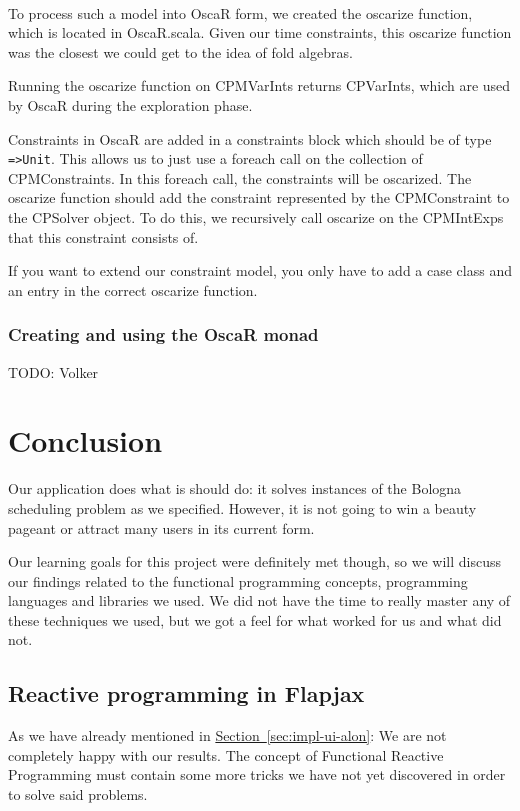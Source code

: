 \documentclass[a4paper]{article}
\begin{document}
\hspace*{1em}\\
To process such a model into OscaR form, 
we created the oscarize function, which is located in OscaR.scala.
Given our time constraints, 
this oscarize function was the closest we could get to the idea of fold algebras.

Running the oscarize function on CPMVarInts returns CPVarInts,
which are used by OscaR during the exploration phase.

Constraints in OscaR are added in a constraints block which should be of type
\verb|=>Unit|.
This allows us to just use a foreach call on the collection of CPMConstraints.
In this foreach call, the constraints will be oscarized.
The oscarize function should add the constraint represented by the CPMConstraint
to the CPSolver object.
To do this, we recursively call oscarize on the CPMIntExps
that this constraint consists of.

If you want to extend our constraint model,
you only have to add a case class and an entry in the correct oscarize function.


\subsubsection{Creating and using the OscaR monad}
{\Large TODO:} Volker



\section{Conclusion}
\label{sec:conclusion}
Our application does what is should do:
it solves instances of the Bologna scheduling problem as we specified.
However, it is not going to win a beauty pageant or attract many users in its 
current form.

Our learning goals for this project were definitely met though,
so we will discuss our findings related to the functional programming concepts,
programming languages and libraries we used.
We did not have the time to really master any of these techniques we used,
but we got a feel for what worked for us and what did not.

\subsection{Reactive programming in Flapjax}
As we have already mentioned in 
\hyperref[sec:impl-ui-alon]{Section~\ref*{sec:impl-ui-alon}}:
We are not completely happy with our results.
The concept of Functional Reactive Programming must contain some more tricks we
have not yet discovered in order to solve said problems. 
\end{document}
